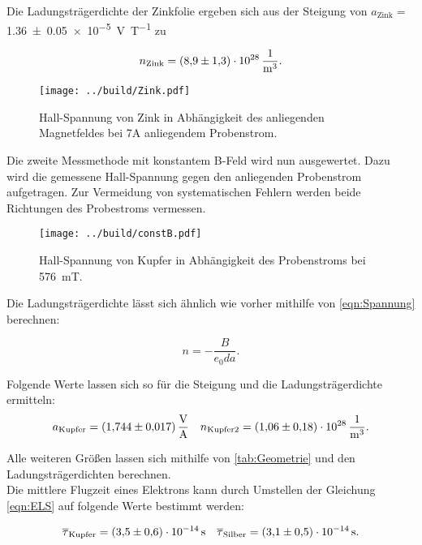 \noindent Die Ladungsträgerdichte der Zinkfolie ergeben sich aus der Steigung von $a_\text{Zink}=$\qty{1.36\pm0.05e-5}{\volt\per\tesla}
zu 

\begin{equation*}
    n_\text{Zink} = \qty{8.9\pm1.3e28}{\per\cubic\meter}.
\end{equation*}

\begin{figure}[H]
    \label{Zink}
    \texttt{[image: ../build/Zink.pdf]}
    \caption{Hall-Spannung von Zink in Abhängigkeit des anliegenden Magnetfeldes bei 7A anliegendem Probenstrom.}
\end{figure}

\noindent Die zweite Messmethode mit konstantem B-Feld wird nun ausgewertet. Dazu wird die gemessene Hall-Spannung 
gegen den anliegenden Probenstrom aufgetragen. Zur Vermeidung von systematischen Fehlern werden beide Richtungen des 
Probestroms vermessen.

\begin{figure}[H]
    \texttt{[image: ../build/constB.pdf]}
    \caption{Hall-Spannung von Kupfer in Abhängigkeit des Probenstroms bei \qty{576}{\milli\tesla}.}
\end{figure}

\noindent Die Ladungsträgerdichte lässt sich ähnlich wie vorher mithilfe von \eqref{eqn:Spannung} berechnen:

\begin{equation*}
    n = - \frac{B}{e_0 d a}.
\end{equation*}

Folgende Werte lassen sich so für die Steigung und die Ladungsträgerdichte ermitteln:
\begin{align*}
    a_\text{Kupfer}=\qty{1.744 \pm 0.017}{\volt\per\ampere} && n_\text{Kupfer2} = \qty{1.06\pm0.18e28}{\per\cubic\meter}.
\end{align*}

\noindent Alle weiteren Größen lassen sich mithilfe von \autoref{tab:Geometrie} und den Ladungsträgerdichten 
berechnen.\\
\noindent Die mittlere Flugzeit eines Elektrons kann durch Umstellen der Gleichung \eqref{eqn:ELS} auf folgende Werte 
bestimmt werden:

\begin{align*}
    \overline\tau_\text{Kupfer} = \qty{3.5\pm0.6e-14}{\second} && \overline\tau_\text{Silber} = \qty{3.1\pm0.5e-14}{\second}.
\end{align*}

